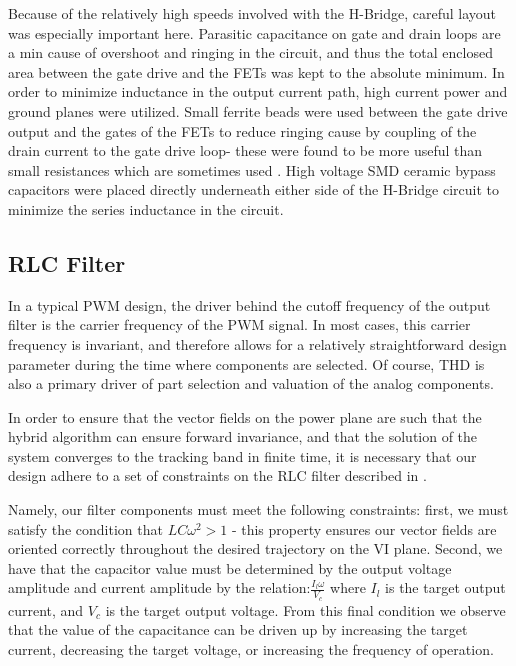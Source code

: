 Because of the relatively high speeds involved with the H-Bridge, careful layout was especially important here. Parasitic capacitance on gate and drain loops are a min cause of overshoot and ringing in the circuit, and thus the total enclosed area between the gate drive and the FETs was kept to the absolute minimum. In order to minimize inductance in the output current path, high current power and ground planes were utilized. Small ferrite beads were used between the gate drive output and the gates of the FETs to reduce ringing cause by coupling of the drain current to the gate drive loop- these were found to be more useful than small resistances which are sometimes used \cite{transphorm}. High voltage SMD ceramic bypass capacitors were placed directly underneath either side of the H-Bridge circuit to minimize the series inductance in the circuit. 
  
\subsection{RLC Filter}
In a typical PWM design, the driver behind the cutoff frequency of the output filter is the carrier frequency of the PWM signal. In most cases, this carrier frequency is invariant, and therefore allows for a relatively straightforward design parameter during the time where components are selected. Of course, THD is also a primary driver of part selection and valuation of the analog components.


In order to ensure that the vector fields on the power plane are such that the hybrid algorithm can ensure forward invariance, and that the solution of the system converges to the tracking band in finite time,  it is necessary that our design adhere to a set of constraints on the RLC filter described in \cite{ricardo}. 

Namely, our filter components must meet the following constraints: first, we must satisfy the condition that $LC\omega^2>1$ - this property ensures our vector fields are oriented correctly throughout the desired trajectory on the VI plane. Second, we have that the capacitor value must be determined by the output voltage amplitude and current amplitude by the relation:$\frac{I_l\omega}{V_c}$ where $I_l$ is the target output current, and $V_c$ is the target output voltage. From this final condition we observe that the value of the capacitance can be driven up by increasing the target current, decreasing the target voltage, or increasing the frequency of operation. 

